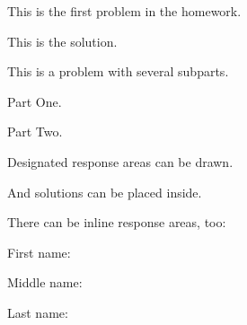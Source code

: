 \documentclass{dscproblemset}
\begin{document}

\nameoneverypage{}

\begin{probset}

    \begin{prob}
        This is the first problem in the homework.

        \begin{soln}
            This is the solution.
        \end{soln}

    \end{prob}

    \begin{prob}
        This is a problem with several subparts.

        \begin{subprobset}
            \begin{subprob}
                Part One.
            \end{subprob}

            \begin{subprob}
                Part Two.
            \end{subprob}
        \end{subprobset}

    \end{prob}

    \begin{prob}
        Designated response areas can be drawn.

        \begin{responsebox}{2in}
            And solutions can be placed inside.
        \end{responsebox}
    \end{prob}

    \begin{prob}
        There can be inline response areas, too:

        \setlength{\inlineresponseboxwidth}{5in}

        First name: 

        Middle name: 

        Last name: 

    \end{prob}


\end{probset}
\end{document}
